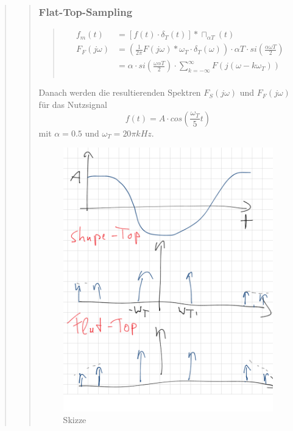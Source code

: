 \begin{quote}
\begin{quote}
        \subsubsection{Flat-Top-Sampling}
		\begin{quote}
			\begin{equation*}
            	\begin{split}
            		f_m (t) &= [f (t) \cdot \delta_T (t)] \ast \sqcap_{\alpha T} (t)\\
            		F_F (j\omega) &= \left ( \frac{1}{2 \pi} F (j\omega) \ast \omega_T
            		\cdot \delta_T (\omega) \right) \cdot \alpha T \cdot si (\frac{\alpha \omega T}{2})\\
            		&= \alpha \cdot si \left( \frac{\omega \alpha T}{2} \right) \cdot \sum_{k=-\infty}^{\infty} F(j(\omega -
            		k\omega_T))\\
            	\end{split}
            \end{equation*}
		\end{quote}
		
		Danach werden die resultierenden Spektren $F_S (j\omega)$ und $F_F (j\omega)$
		für das Nutzsignal
		\begin{equation*}
        f(t) = A \cdot cos(\frac{\omega_T}{5}t)    	
        \end{equation*}
		mit $\alpha = 0.5$ und $\omega_T = 20\pi kHz$.
		
		
		 \begin{figure}[H]
    \centering
        \includegraphics[scale=0.7, trim = 0cm 0cm 0cm 0cm,
        clip]{./Bilder/Vorbereitungskizze}
            \caption{Skizze}
  	    \end{figure}
    

\end{quote}
\end{quote}
